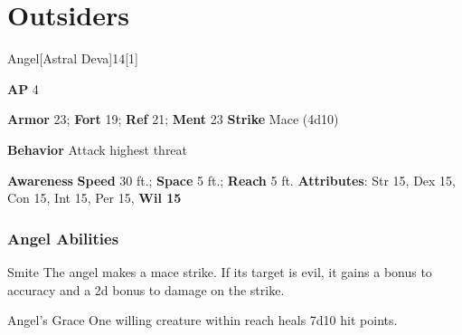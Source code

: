 \section{Outsiders}
\begin{monsection}{Angel}[Astral Deva]{14}[1]
\vspace{-1em}\vspace{-1em}
\begin{spellcontent}
\begin{spelltargetinginfo}
{\textbf{AP} 4}

\pari \textbf{Armor} 23;
\textbf{Fort} 19;
\textbf{Ref} 21;
\textbf{Ment} 23
\pari \textbf{Strike} Mace  (4d10)



\pari \textbf{Behavior} Attack highest threat
\end{spelltargetinginfo}
\end{spellcontent}

\begin{monsterfooter}
\pari \textbf{Awareness} 
\pari \textbf{Speed} 30 ft.;
\textbf{Space} 5 ft.;
\textbf{Reach} 5 ft.
\pari \textbf{Attributes}:
Str 15,
Dex 15,
Con 15,
Int 15,
Per 15,
\textbf{Wil 15}
\end{monsterfooter}
\end{monsection}


\subsubsection{Angel Abilities}

\begin{ability}{Smite}
The angel makes a mace strike.
If its target is evil, it gains a  bonus to accuracy and a \plus2d bonus to damage on the strike.
\end{ability}

\vspace{0.5em}
\begin{ability}{Angel's Grace}
One willing creature within reach heals 7d10 hit points.
\end{ability}

